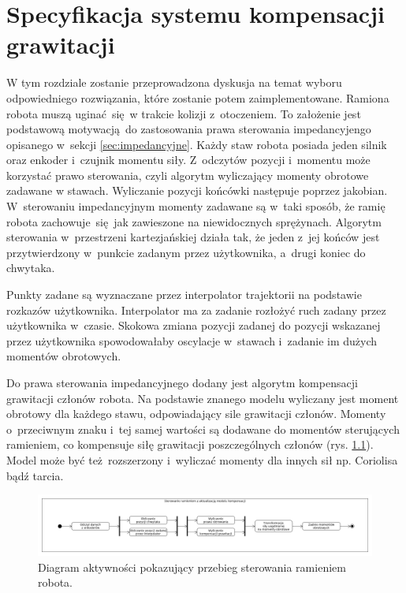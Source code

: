 
\chapter{Specyfikacja systemu kompensacji grawitacji\label{chap:implementacja_systemu}}
W tym rozdziale zostanie przeprowadzona dyskusja na temat wyboru odpowiedniego rozwiązania, które zostanie potem zaimplementowane. Ramiona robota muszą uginać się w trakcie kolizji z~otoczeniem. To założenie jest podstawową motywacją do zastosowania prawa sterowania impedancyjengo opisanego w~sekcji \ref{sec:impedancyjne}. Każdy staw robota posiada jeden silnik oraz enkoder i~czujnik momentu siły. Z~odczytów pozycji i~momentu może korzystać prawo sterowania, czyli algorytm wyliczający momenty obrotowe zadawane w stawach. Wyliczanie pozycji końcówki następuje poprzez jakobian. W~sterowaniu impedancyjnym momenty zadawane są w~taki sposób, że ramię robota zachowuje się jak zawieszone na niewidocznych sprężynach. Algorytm sterowania w~przestrzeni kartezjańskiej działa tak, że jeden z~jej końców jest przytwierdzony w~punkcie zadanym przez użytkownika, a~drugi koniec do chwytaka. 

Punkty zadane są wyznaczane przez interpolator trajektorii na podstawie rozkazów użytkownika. Interpolator ma za zadanie rozłożyć ruch zadany przez użytkownika w~czasie. Skokowa zmiana pozycji zadanej do pozycji wskazanej przez użytkownika spowodowałaby oscylacje w~stawach i~zadanie im dużych momentów obrotowych.

Do prawa sterowania impedancyjnego dodany jest algorytm kompensacji grawitacji członów robota. Na podstawie znanego modelu wyliczany jest moment obrotowy dla każdego stawu, odpowiadający sile grawitacji członów. Momenty o~przeciwnym znaku i~tej samej wartości są dodawane do momentów sterujących ramieniem, co kompensuje siłę grawitacji poszczególnych członów (rys. \ref{fig:sterowanie}). Model może być też rozszerzony i~wyliczać momenty dla innych sił np. Coriolisa bądź tarcia.

\begin{figure}
	\centering
	\includegraphics[width=.99\textwidth]{images/kompensacja.png}
	\caption{Diagram aktywności pokazujący przebieg sterowania ramieniem robota.}
	\label{fig:sterowanie}
\end{figure}

